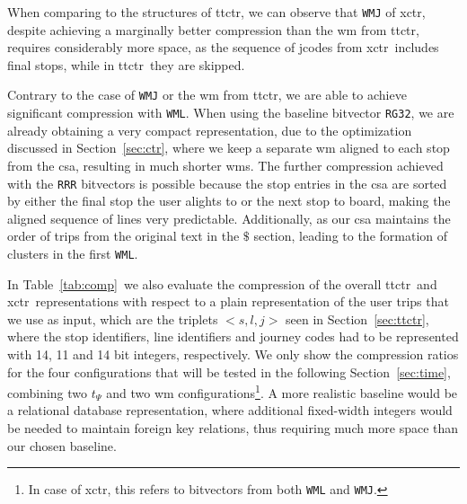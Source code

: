    When comparing to the structures of \gls{ttctr}, we can observe that \texttt{WMJ} of \gls{xctr}, despite achieving a marginally better compression than the \gls{wm} from \gls{ttctr}, requires considerably more space, as the sequence of jcodes from \gls{xctr}~includes final stops, while in \gls{ttctr}~they are skipped.
    
    Contrary to the case of \texttt{WMJ} or the \gls{wm} from \gls{ttctr}, we are able to achieve significant compression with \texttt{WML}. When using the baseline bitvector \texttt{RG32}, we are already obtaining a very compact representation, due to the optimization discussed in Section~\ref{sec:ctr}, where we keep a separate \gls{wm} aligned to each stop from the \gls{csa}, resulting in much shorter \gls{wm}s. The further compression achieved with the \texttt{RRR} bitvectors is possible because the stop entries in the \gls{csa} are sorted by either the final stop the user alights to or the next stop to board, making the aligned sequence of lines very predictable. Additionally, as our \gls{csa} maintains the order of trips from the original text in the $\$$ section, leading to the formation of clusters in the first \texttt{WML}.
    
    In Table~\ref{tab:comp}~we also evaluate the compression of the overall \gls{ttctr}~and \gls{xctr}~representations with respect to a plain representation of the user trips that we use as input, which are the triplets $<s,l,j>$ seen in Section~\ref{sec:ttctr}, where the stop identifiers, line identifiers and journey codes had to be represented with 14, 11 and 14 bit integers, respectively. We only show the compression ratios for the four configurations that will be tested in the following Section~\ref{sec:time}, combining two $t_{\Psi}$ and two \gls{wm} configurations\footnote{In case of \gls{xctr}, this refers to bitvectors from both \texttt{WML} and \texttt{WMJ}.}. A more realistic baseline would be a relational database representation, where additional fixed-width integers would be needed to maintain foreign key relations, thus requiring much more space than our chosen baseline.
    
